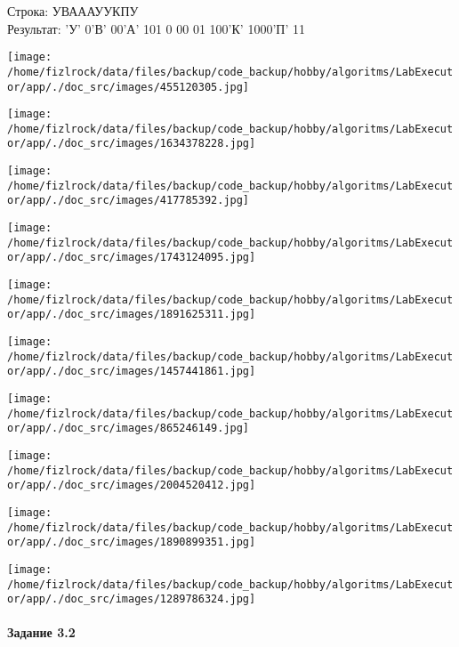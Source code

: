 \documentclass[a4paper, 12pt]{article}
\begin{document}
Строка: 
УВАААУУКПУ\\
Результат: 'У' 0'В' 00'А' 101 0 00 01 100'К' 1000'П' 11

\texttt{[image: /home/fizlrock/data/files/backup/code\_backup/hobby/algoritms/LabExecutor/app/./doc\_src/images/455120305.jpg]}

\texttt{[image: /home/fizlrock/data/files/backup/code\_backup/hobby/algoritms/LabExecutor/app/./doc\_src/images/1634378228.jpg]}

\texttt{[image: /home/fizlrock/data/files/backup/code\_backup/hobby/algoritms/LabExecutor/app/./doc\_src/images/417785392.jpg]}

\texttt{[image: /home/fizlrock/data/files/backup/code\_backup/hobby/algoritms/LabExecutor/app/./doc\_src/images/1743124095.jpg]}

\texttt{[image: /home/fizlrock/data/files/backup/code\_backup/hobby/algoritms/LabExecutor/app/./doc\_src/images/1891625311.jpg]}

\texttt{[image: /home/fizlrock/data/files/backup/code\_backup/hobby/algoritms/LabExecutor/app/./doc\_src/images/1457441861.jpg]}

\texttt{[image: /home/fizlrock/data/files/backup/code\_backup/hobby/algoritms/LabExecutor/app/./doc\_src/images/865246149.jpg]}

\texttt{[image: /home/fizlrock/data/files/backup/code\_backup/hobby/algoritms/LabExecutor/app/./doc\_src/images/2004520412.jpg]}

\texttt{[image: /home/fizlrock/data/files/backup/code\_backup/hobby/algoritms/LabExecutor/app/./doc\_src/images/1890899351.jpg]}

\texttt{[image: /home/fizlrock/data/files/backup/code\_backup/hobby/algoritms/LabExecutor/app/./doc\_src/images/1289786324.jpg]}
\pagebreak

\paragraph{Задание 3.2}
\end{document}
